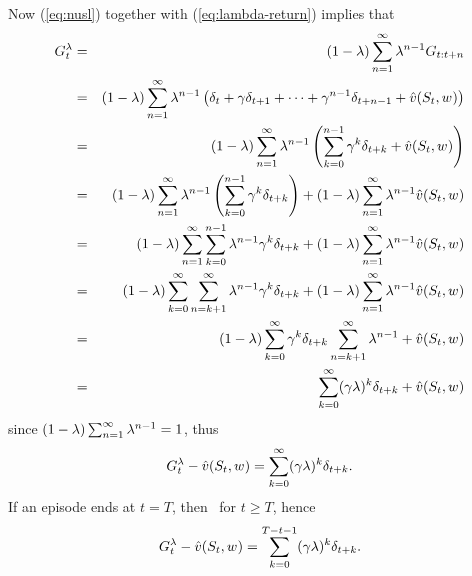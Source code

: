 Now (\ref{eq:nusl}) together with (\ref{eq:lambda-return}) implies that
\begin{eqnarray*}
G^{\lambda}_{t} &=& (1-\lambda) \sum_{n=1}^\infty \lambda^{n-1} G_{{t}:{t+n}}
\\
&=& (1-\lambda) \sum_{n=1}^\infty \lambda^{n-1}
\left( \delta_{t} + \gamma \delta_{t+1} +  \cdots + \gamma^{n-1} \delta_{t+n-1} + \hat{v}(S_{t}, w_{}) \right)
\\
&=& (1-\lambda) \sum_{n=1}^\infty \lambda^{n-1}
\left(\sum_{k=0}^{n-1} \gamma^k \delta_{t+k} + \hat{v}(S_{t}, w_{}) \right)
\\
&=& (1-\lambda) \sum_{n=1}^\infty \lambda^{n-1}
\left(\sum_{k=0}^{n-1} \gamma^k \delta_{t+k} \right)
+ (1-\lambda) \sum_{n=1}^\infty \lambda^{n-1} \hat{v}(S_{t}, w_{})
\\
&=& (1-\lambda) \sum_{n=1}^{\infty} \sum_{k=0}^{n-1} \lambda^{n-1} \gamma^k \delta_{t+k}
+ (1-\lambda) \sum_{n=1}^\infty \lambda^{n-1} \hat{v}(S_{t}, w_{})
\\
&=& (1-\lambda) \sum_{k=0}^{\infty} \sum_{n=k+1}^\infty \lambda^{n-1} \gamma^k \delta_{t+k}
+ (1-\lambda) \sum_{n=1}^\infty \lambda^{n-1} \hat{v}(S_{t}, w_{})
\\
&=& (1-\lambda) \sum_{k=0}^{\infty} \gamma^k \delta_{t+k} \sum_{n=k+1}^\infty \lambda^{n-1}
+ \hat{v}(S_{t}, w_{})
\\
&=& \sum_{k=0}^{\infty} (\gamma \lambda)^k \delta_{t+k} + \hat{v}(S_{t}, w_{})
\end{eqnarray*}
since $(1-\lambda) \sum_{n=1}^\infty \lambda^{n-1} = 1$,
thus
\begin{equation}
G^{\lambda}_{t} - \hat{v}(S_{t}, w_{}) = \sum_{k=0}^{\infty} (\gamma \lambda)^k \delta_{t+k}.
\end{equation}
If an episode ends at $t=T$, then \ for $t\geq T$,
hence
\begin{equation}
\label{eq:bysig}
G^{\lambda}_{t} - \hat{v}(S_{t}, w_{}) = \sum_{k=0}^{T-t-1} (\gamma \lambda)^k \delta_{t+k}.
\end{equation}

